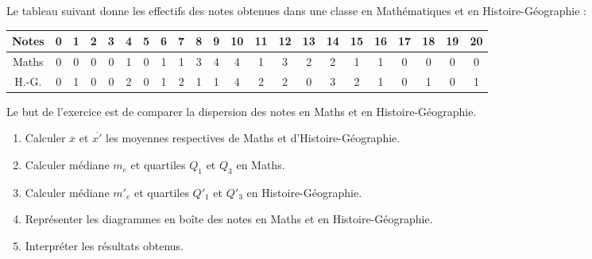 \begin{exo}
Le tableau suivant donne les effectifs des notes obtenues dans une classe en Math\'ematiques et en Histoire-G\'eographie :
\begin{center}
\begin{small}\begin{tabular}{|*{22}{c|}}
\hline
Notes & 0 & 1 & 2 & 3 & 4 & 5 & 6 & 7&  8 & 9 &10 &11 &12& 13 &14& 15 &16& 17& 18 &19 &20 \\ \hline
Maths& 0& 0 &0 &0 &1& 0& 1 &1 &3 &4& 4& 1& 3& 2&2 &1 &1& 0& 0& 0& 0\\ \hline
H.-G. &0 &1& 0& 0 &2 &0 &1 &2 &1& 1& 4& 2& 2& 0 &3& 2 &1 &0& 1& 0& 1\\ \hline
\end{tabular}\end{small}
\end{center}
 Le but de l'exercice est de comparer la dispersion des notes en Maths et en Histoire-G\'eographie.

\begin{enumerate}
	\item Calculer $\overline{x}$ et $\overline{x'}$ les moyennes respectives de Maths et d'Histoire-G\'eographie.
	\item Calculer m\'ediane $m_e$ et quartiles $Q_1$ et $Q_3$ en Maths.
	\item Calculer m\'ediane $m'_e$ et quartiles $Q'_1$ et $Q'_3$ en Histoire-G\'eographie.
	\item Repr\'esenter les diagrammes en bo\^ite des notes en Maths et en Histoire-G\'eographie.
	\item Interpr\'eter les r\'esultats obtenus.
\end{enumerate}

\end{exo}






